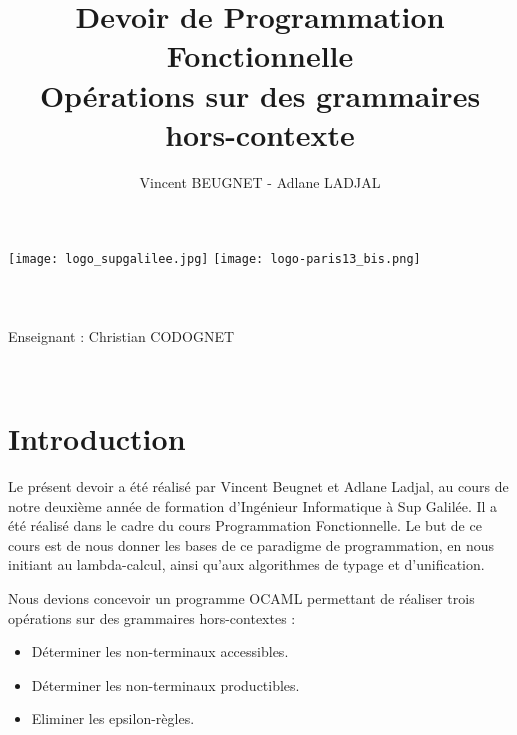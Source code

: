 \documentclass[11pt,a4paper]{article}
\author{Vincent BEUGNET - Adlane LADJAL}
\title{Devoir de Programmation Fonctionnelle \\ Opérations sur des grammaires hors-contexte}
\begin{document}
\lstset{language=caml,
 columns=[c]fixed,
 basicstyle=\small\ttfamily,
 keywordstyle=\bfseries,
 upquote=true,
 commentstyle=,
 breaklines=true,
 showstringspaces=false}          %

\makeatletter
\begin{titlepage}
	\centering
	\texttt{[image: logo\_supgalilee.jpg]}
	\hfill
	\texttt{[image: logo-paris13\_bis.png]} \\
    \vspace{5cm}
       {\LARGE \textbf{\@title}} \\
    \vspace{2em}
        {\large \@author }\\
    \vspace{1em}
        {\textit{\@date}} \\
    \vspace{2em}
    	\vspace{2em}
    		{Enseignant : Christian CODOGNET} \\
    \vfill
\end{titlepage}


\newpage
~
\newpage

\renewcommand{\contentsname}{Sommaire}
\tableofcontents

\newpage

\pagestyle{plain}

\section{Introduction}
Le présent devoir a été réalisé par Vincent Beugnet
et Adlane Ladjal, au cours de notre deuxième année
de formation d'Ingénieur Informatique à  Sup Galilée.
Il a été réalisé dans le cadre du cours Programmation
Fonctionnelle. Le but de ce cours est de nous donner
les bases de ce paradigme de programmation, en nous
initiant au lambda-calcul, ainsi qu'aux algorithmes de
typage et d'unification.

Nous devions concevoir un programme OCAML permettant de
réaliser trois opérations sur des grammaires hors-contextes :

\begin{itemize}
    \item Déterminer les non-terminaux accessibles.
    \item Déterminer les non-terminaux productibles.
    \item Eliminer les epsilon-règles.
\end{itemize}
\end{document}
